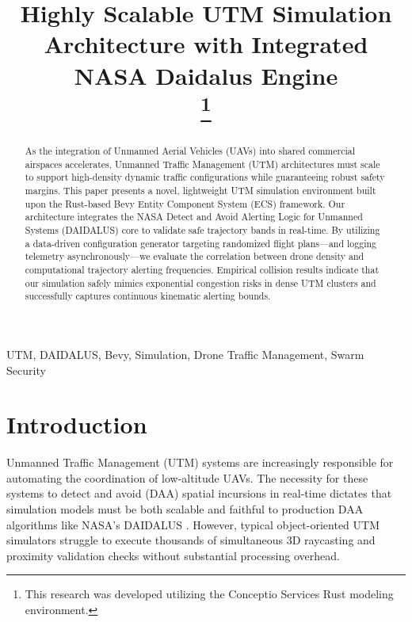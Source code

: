 \documentclass[conference]{IEEEtran}
\begin{document}
\title{Highly Scalable UTM Simulation Architecture with Integrated NASA Daidalus Engine \\
\thanks{This research was developed utilizing the Conceptio Services Rust modeling environment.}
}

\author{
}

\maketitle

\begin{abstract}
As the integration of Unmanned Aerial Vehicles (UAVs) into shared commercial airspaces accelerates, Unmanned Traffic Management (UTM) architectures must scale to support high-density dynamic traffic configurations while guaranteeing robust safety margins. This paper presents a novel, lightweight UTM simulation environment built upon the Rust-based Bevy Entity Component System (ECS) framework. Our architecture integrates the NASA Detect and Avoid Alerting Logic for Unmanned Systems (DAIDALUS) core to validate safe trajectory bands in real-time. By utilizing a data-driven configuration generator targeting randomized flight plans—and logging telemetry asynchronously—we evaluate the correlation between drone density and computational trajectory alerting frequencies. Empirical collision results indicate that our simulation safely mimics exponential congestion risks in dense UTM clusters and successfully captures continuous kinematic alerting bounds.
\end{abstract}

\begin{IEEEkeywords}
UTM, DAIDALUS, Bevy, Simulation, Drone Traffic Management, Swarm Security
\end{IEEEkeywords}

\section{Introduction}
Unmanned Traffic Management (UTM) systems are increasingly responsible for automating the coordination of low-altitude UAVs. The necessity for these systems to detect and avoid (DAA) spatial incursions in real-time dictates that simulation models must be both scalable and faithful to production DAA algorithms like NASA's DAIDALUS \cite{daidalus_paper}. However, typical object-oriented UTM simulators struggle to execute thousands of simultaneous 3D raycasting and proximity validation checks without substantial processing overhead.
\end{document}
